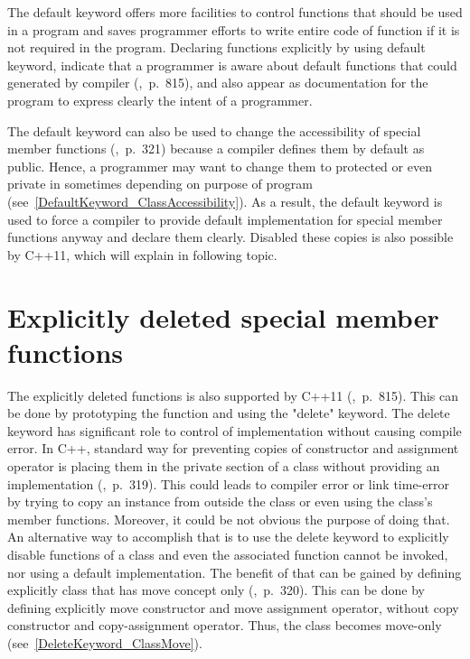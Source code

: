 \documentclass[11pt]{report}
\begin{document}
The default keyword offers more facilities to control functions that should be used in a program and saves programmer efforts to write entire code of function if it is not required in the program. Declaring functions explicitly by using default keyword, indicate that a programmer is aware about default functions that could generated by compiler (\cite{Horstmann:2008:BC},~p.~815), and also appear as documentation for the program to express clearly the intent of a programmer.

The default keyword can also be used to change the accessibility of special member functions (\cite{Williams:2012:CCA},~p.~321) because a compiler defines them by default as public. Hence, a programmer may want to change them to protected or even private in sometimes depending on purpose of program (see~\ref{DefaultKeyword_ClassAccessibility}). As a result, the default keyword is used to force a compiler to provide default implementation for special member functions anyway and declare them clearly. Disabled these copies is also possible by C++11, which will explain in following topic.

\section{Explicitly deleted special member functions}
\label{section: Deleted special member functions}
The explicitly deleted functions is also supported by C++11 (\cite{Horstmann:2008:BC},~p.~815). This can be done by prototyping the function and using the "delete" keyword. The delete keyword has significant role to control of implementation without causing compile error. In C++, standard way for preventing copies of constructor and assignment operator is placing them in the private section of a class without providing an implementation (\cite{Williams:2012:CCA},~p.~319). This could leads to compiler error or link time-error by trying to copy an instance from outside the class or even using the class's member functions. Moreover, it could be not obvious the purpose of doing that. An alternative way to accomplish that is to use the delete keyword to explicitly disable functions of a class and even the associated function cannot be invoked, nor using a default implementation. The benefit of that can be gained by defining explicitly class that has move concept only (\cite{Williams:2012:CCA},~p.~320). This can be done by defining explicitly move constructor and move assignment operator, without copy constructor and copy-assignment operator. Thus, the class becomes move-only (see~\ref{DeleteKeyword_ClassMove}).
\end{document}
